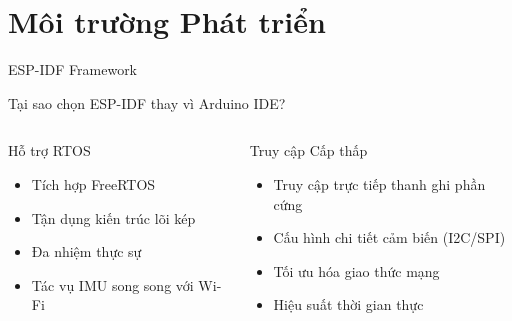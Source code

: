\section{Môi trường Phát triển}

\begin{frame}{ESP-IDF Framework}
\begin{block}{Tại sao chọn ESP-IDF thay vì Arduino IDE?}
\end{block}

\begin{columns}
\begin{alertblock}{Hỗ trợ RTOS}
\begin{itemize}
\item Tích hợp FreeRTOS
\item Tận dụng kiến trúc lõi kép
\item Đa nhiệm thực sự
\item Tác vụ IMU song song với Wi-Fi
\end{itemize}
\end{alertblock}

\begin{alertblock}{Truy cập Cấp thấp}
\begin{itemize}
\item Truy cập trực tiếp thanh ghi phần cứng
\item Cấu hình chi tiết cảm biến (I2C/SPI)
\item Tối ưu hóa giao thức mạng
\item Hiệu suất thời gian thực
\end{itemize}
\end{alertblock}
\end{columns}
\end{frame}

